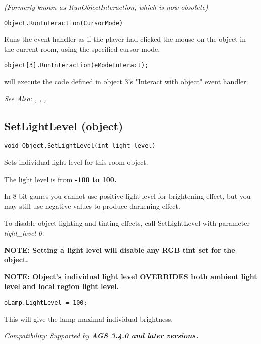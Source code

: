 \it{(Formerly known as RunObjectInteraction, which is now obsolete)}

\begin{verbatim}
Object.RunInteraction(CursorMode)
\end{verbatim}
Runs the event handler as if the player had clicked the mouse
on the object in the current room, using the specified cursor mode.

\begin{verbatim}
object[3].RunInteraction(eModeInteract);
\end{verbatim}
will execute the code defined in object 3's "Interact with object" event handler.

\it{See Also:} ,
,
,


\subsection{SetLightLevel (object)}\label{Object.SetLightLevel}%

\begin{verbatim}
void Object.SetLightLevel(int light_level)
\end{verbatim}
Sets individual light level for this room object.

The light level is from \bf{-100 to 100}.

In 8-bit games you cannot use positive light level for brightening effect, but you
may still use negative values to produce darkening effect.

To disable object lighting and tinting effects, call SetLightLevel with parameter \it{light_level} 0.

\bf{NOTE}: Setting a light level will disable any RGB tint set for the object.

\bf{NOTE:} Object's individual light level OVERRIDES both ambient light level and local region light level.

\begin{verbatim}
oLamp.LightLevel = 100;
\end{verbatim}
This will give the lamp maximal individual brightness.

\it{Compatibility:} Supported by \bf{AGS 3.4.0} and later versions.

